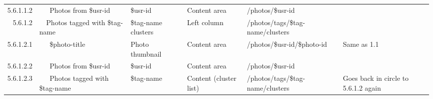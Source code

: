 \documentclass[12pt,a4paper]{article}
\begin{document}
\begin{landscape}
\begin{table}[h!b!p!]
\begin{center}
\begin{tiny}
\begin{tabular}{r|l|l|l|l|p{3cm}}
                    5.6.1.1.2 &
                    ~~~Photos from \$usr-id &
                    \$usr-id &
                    Content area &
                    /photos/\$usr-id &
                    \\

                  5.6.1.2 &
                  ~~Photos tagged with \$tag-name &
                  \$tag-name clusters &
                  Left column &
                  /photos/tags/\$tag-name/clusters &
                  \\

                    5.6.1.2.1 &
                    ~~~\$photo-title &
                    Photo thumbnail &
                    Content area &
                    /photos/\$usr-id/\$photo-id &
                    Same as 1.1 \\

                    5.6.1.2.2 &
                    ~~~Photos from \$usr-id &
                    \$usr-id &
                    Content area &
                    /photos/\$usr-id &
                    \\

                    5.6.1.2.3 &
                    ~~~Photos tagged with \$tag-name &
                    \$tag-name &
                    Content (cluster list) &
                    /photos/tags/\$tag-name/clusters &
                    Goes back in circle to 5.6.1.2 again \\

          \end{tabular}
        \rm
      \end{tiny}
    \end{center}
  \end{table}
\end{landscape}
\end{document}
